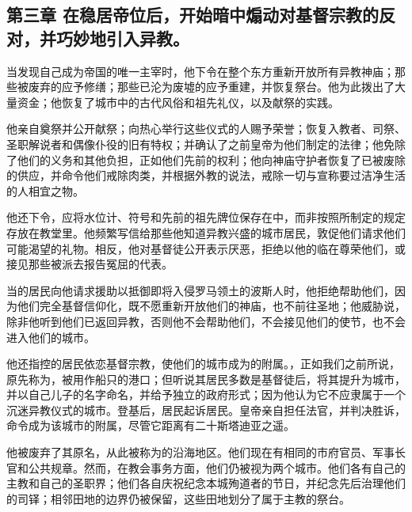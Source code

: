
\subsection{第三章  在稳居帝位后，开始暗中煽动对基督宗教的反对，并巧妙地引入异教。}

当发现自己成为帝国的唯一主宰时，他下令在整个东方重新开放所有异教神庙；那些被废弃的应予修缮；那些已沦为废墟的应予重建，并恢复祭台。他为此拨出了大量资金；他恢复了城市中的古代风俗和祖先礼仪，以及献祭的实践。\par

他亲自奠祭并公开献祭；向热心举行这些仪式的人赐予荣誉；恢复入教者、司祭、圣职解说者和偶像仆役的旧有特权；并确认了之前皇帝为他们制定的法律；他免除了他们的义务和其他负担，正如他们先前的权利；他向神庙守护者恢复了已被废除的供应，并命令他们戒除肉类，并根据外教的说法，戒除一切与宣称要过洁净生活的人相宜之物。\par

他还下令，应将水位计、符号和先前的祖先牌位保存在中，而非按照所制定的规定存放在教堂里。他频繁写信给那些他知道异教兴盛的城市居民，敦促他们请求他们可能渴望的礼物。相反，他对基督徒公开表示厌恶，拒绝以他的临在尊荣他们，或接见那些被派去报告冤屈的代表。\par

当的居民向他请求援助以抵御即将入侵罗马领土的波斯人时，他拒绝帮助他们，因为他们完全基督信仰化，既不愿重新开放他们的神庙，也不前往圣地；他威胁说，除非他听到他们已返回异教，否则他不会帮助他们，不会接见他们的使节，也不会进入他们的城市。\par

他还指控的居民依恋基督宗教，使他们的城市成为的附属。，正如我们之前所说，原先称为，被用作船只的港口；但听说其居民多数是基督徒后，将其提升为城市，并以自己儿子的名字命名，并给予独立的政府形式；因为他认为它不应隶属于一个沉迷异教仪式的城市。登基后，居民起诉居民。皇帝亲自担任法官，并判决胜诉，命令成为该城市的附属，尽管它距离有二十斯塔迪亚之遥。\par

他被废弃了其原名，从此被称为的沿海地区。他们现在有相同的市府官员、军事长官和公共规章。然而，在教会事务方面，他们仍被视为两个城市。他们各有自己的主教和自己的圣职界；他们各自庆祝纪念本城殉道者的节日，并纪念先后治理他们的司铎；相邻田地的边界仍被保留，这些田地划分了属于主教的祭台。\par

